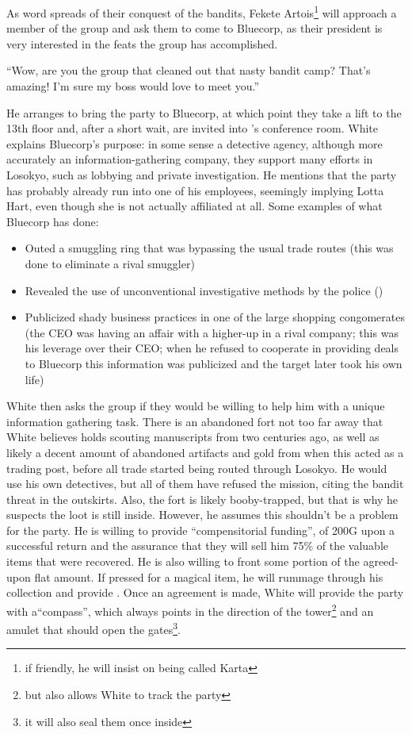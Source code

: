  As word spreads of their conquest of the bandits, Fekete Artois\footnote{if friendly, he will insist on being called Karta} will approach a member of the group and ask them to come to Bluecorp, as their president is very interested in the feats the group has accomplished.\\
\begin{center}
``Wow, are you the group that cleaned out that nasty bandit camp? That's amazing! I'm sure my boss would love to meet you.''
\end{center}
He arranges to bring the party to Bluecorp, at which point they take a lift to the 13th floor and, after a short wait, are invited into 's conference room. White explains Bluecorp's purpose: in some sense a detective agency, although more accurately an information-gathering company, they support many efforts in Losokyo, such as lobbying and private investigation. He mentions that the party has probably already run into one of his employees, seemingly implying Lotta Hart, even though she is not actually affiliated at all. Some examples of what Bluecorp has done:
\begin{itemize}
\item Outed a smuggling ring that was bypassing the usual trade routes (this was done to eliminate a rival smuggler)
\item Revealed the use of unconventional investigative methods by the police ()
\item Publicized shady business practices in one of the large shopping congomerates (the CEO was having an affair with a higher-up in a rival company; this was his leverage over their CEO; when he refused to cooperate in providing deals to Bluecorp this information was publicized and the target later took his own life)
\end{itemize}
White then asks the group if they would be willing to help him with a unique information gathering task. There is an abandoned fort not too far away that White believes holds scouting manuscripts from two centuries ago, as well as likely a decent amount of abandoned artifacts and gold from when this acted as a trading post, before all trade started being routed through Losokyo. He would use his own detectives, but all of them have refused the mission, citing the bandit threat in the outskirts. Also, the fort is likely booby-trapped, but that is why he suspects the loot is still inside. However, he assumes this shouldn't be a problem for the party. He is willing to provide ``compensitorial funding'', of 200G upon a successful return and the assurance that they will sell him 75\% of the valuable items that were recovered. He is also willing to front some portion of the agreed-upon flat amount. If pressed for a magical item, he will rummage through his collection and provide . Once an agreement is made, White will provide the party with a``compass'', which always points in the direction of the tower\footnote{but also allows White to track the party} and an amulet that should open the gates\footnote{it will also seal them once inside}. \\
